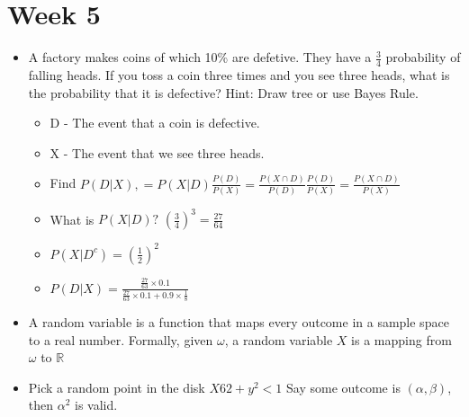 \documentclass[12pt]{article}
\begin{document}
    \section{Week 5}
    \begin{itemize}
        \item A factory makes coins of which 10\% are defetive.
        They have a $\frac{3}{4}$ probability of falling heads.
        If you toss a coin three times and you see three heads, what is the probability that it is defective?
        Hint: Draw tree or use Bayes Rule.
        \begin{itemize}
            \item D - The event that a coin is defective.
            \item X - The event that we see three heads.
            \item Find $P(D|X), = P(X|D)\frac{P(D)}{P(X)} = \frac{P(X \cap D)}{P(D)} \frac{P(D)}{P(X)} = \frac{P(X \cap D)}{P(X)}$
            \item What is $P(X|D)? $ \guillemotright $(\frac{3}{4})^3 = \frac{27}{64}$
            \item $P(X|D^c) = (\frac{1}{2})^2$
            \item $P(D|X) = \frac{\frac{27}{63} \times 0.1}{\frac{27}{63} \times 0.1 + 0.9 \times \frac{1}{8}}$
        \end{itemize}
        \item A random variable is a function that maps every outcome in a sample space to a real number. Formally, given $\omega$,
        a random variable $X$ is a mapping from $\omega$ to $\mathbb{R}$
        \item Pick a random point in the disk $X62+y^2 \less 1$
        Say some outcome is $(\alpha, \beta)$, then $\alpha^2$ is valid.
    \end{itemize}
\end{document}
